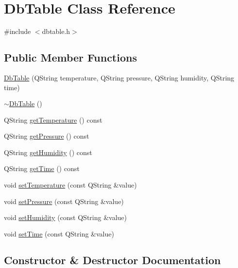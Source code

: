 \hypertarget{class_db_table}{}\section{Db\+Table Class Reference}
\label{class_db_table}


{\ttfamily \#include $<$dbtable.\+h$>$}

\subsection*{Public Member Functions}
\begin{DoxyCompactItemize}
\item 
\hyperlink{class_db_table_a58c18caaf80638d74ca14f5599ae4248}{Db\+Table} (Q\+String temperature, Q\+String pressure, Q\+String humidity, Q\+String time)
\item 
\hyperlink{class_db_table_a3b61984342738abc45b6074e970eeb55}{$\sim$\+Db\+Table} ()
\item 
Q\+String \hyperlink{class_db_table_a7c3362a6fe703dc2c5fa3e217c52792f}{get\+Temperature} () const
\item 
Q\+String \hyperlink{class_db_table_afdc8c975dce8cfd9d578931252eb75cd}{get\+Pressure} () const
\item 
Q\+String \hyperlink{class_db_table_ad14c292fe435fe7b86f48554c75da206}{get\+Humidity} () const
\item 
Q\+String \hyperlink{class_db_table_aeffff61ff7c3a76e04bde211be25860f}{get\+Time} () const
\item 
void \hyperlink{class_db_table_acafd1019a86794179809e6a7b11d3c9f}{set\+Temperature} (const Q\+String \&value)
\item 
void \hyperlink{class_db_table_a14639cd693e8f6e1d48c0d263535a355}{set\+Pressure} (const Q\+String \&value)
\item 
void \hyperlink{class_db_table_a355eec4c57189589d85c5319b18a1b38}{set\+Humidity} (const Q\+String \&value)
\item 
void \hyperlink{class_db_table_a671e83deaebb40c81ada2bb7a92002b0}{set\+Time} (const Q\+String \&value)
\end{DoxyCompactItemize}


\subsection{Constructor \& Destructor Documentation}
\mbox{\label{class_db_table_a58c18caaf80638d74ca14f5599ae4248}} 

